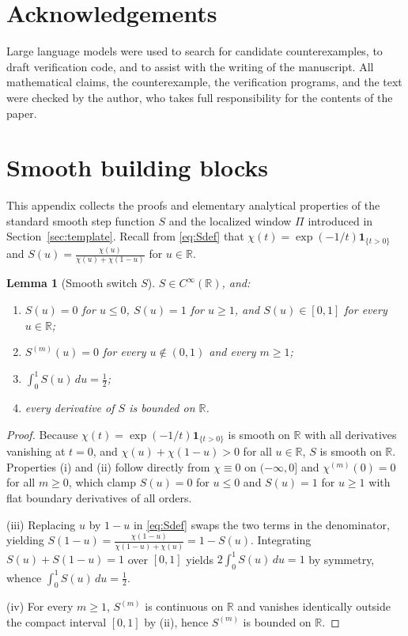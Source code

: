 \documentclass[11pt]{article}
\newtheorem{lemma}[theorem]{Lemma}
\newcommand{\R}{\mathbb{R}}
\begin{document}
\section*{Acknowledgements}

Large language models were used to search for candidate counterexamples,
to draft verification code, and to assist with the writing of the
manuscript. All mathematical claims, the counterexample, the
verification programs, and the text were checked by the author, who
takes full responsibility for the contents of the paper.

\appendix
\section{Smooth building blocks}
\label{sec:app-blocks}

This appendix collects the proofs and elementary analytical properties of the standard smooth step function $S$ and the localized window $\Pi$ introduced in Section~\ref{sec:template}.
Recall from \eqref{eq:Sdef} that $\chi(t)=\exp(-1/t)\mathbf{1}_{\{t>0\}}$ and $S(u)=\frac{\chi(u)}{\chi(u)+\chi(1-u)}$ for $u\in\R$.

\begin{lemma}[Smooth switch $S$]
\label{lem:S}
$S\in C^\infty(\R)$, and:
\begin{enumerate}
\item[(i)] $S(u)=0$ for $u\le0$, $S(u)=1$ for $u\ge1$, and $S(u)\in[0,1]$ for every $u\in\R$;
\item[(ii)] $S^{(m)}(u)=0$ for every $u\notin(0,1)$ and every $m\ge1$;
\item[(iii)] $\int_0^1S(u)\,du=\tfrac12$;
\item[(iv)] every derivative of $S$ is bounded on $\R$.
\end{enumerate}
\end{lemma}

\begin{proof}
Because $\chi(t) = \exp(-1/t)\mathbf{1}_{\{t>0\}}$ is smooth on $\R$ with all derivatives vanishing at $t=0$, and $\chi(u) + \chi(1-u) > 0$ for all $u \in \R$, $S$ is smooth on $\R$.
Properties (i) and (ii) follow directly from $\chi \equiv 0$ on $(-\infty, 0]$ and $\chi^{(m)}(0)=0$ for all $m \ge 0$, which clamp $S(u) = 0$ for $u \le 0$ and $S(u) = 1$ for $u \ge 1$ with flat boundary derivatives of all orders.

(iii) Replacing $u$ by $1-u$ in \eqref{eq:Sdef} swaps the two terms in the denominator, yielding $S(1-u) = \frac{\chi(1-u)}{\chi(1-u)+\chi(u)} = 1 - S(u)$.
Integrating $S(u) + S(1-u) = 1$ over $[0, 1]$ yields $2\int_0^1 S(u)\,du = 1$ by symmetry, whence $\int_0^1 S(u)\,du = \frac12$.

(iv) For every $m \ge 1$, $S^{(m)}$ is continuous on $\R$ and vanishes identically outside the compact interval $[0, 1]$ by (ii), hence $S^{(m)}$ is bounded on $\R$.
\end{proof}
\end{document}
